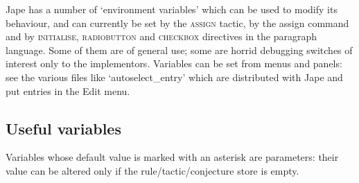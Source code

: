 Jape has a number of `environment variables' which can be used to modify its behaviour, and can currently be set by the \textsc{assign} tactic, by the assign command and by \textsc{initialise, radiobutton} and \textsc{checkbox} directives in the paragraph language. Some of them are of general use; some are horrid debugging switches of interest only to the implementors. Variables can be set from menus and panels: see the various files like `autoselect\_entry' which are distributed with Jape and put entries in the Edit menu.


\subsection{Useful variables}


Variables whose default value is marked with an asterisk are parameters: their value can be altered only if the rule/tactic/conjecture store is empty.



